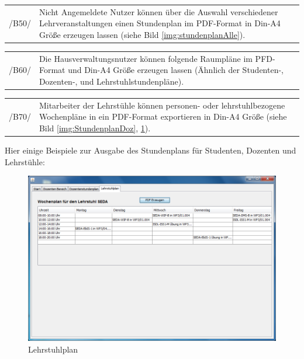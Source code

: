 \begin{tabular}{p{1.5cm}p{14.5cm}}
 /B50/	& Nicht Angemeldete Nutzer können über die Auswahl verschiedener Lehrveranstaltungen einen Stundenplan im PDF-Format in Din-A4 Größe erzeugen lassen (siehe Bild \ref{img:stundenplanAlle}). \\[0.25cm]	 
\end{tabular}

\begin{tabular}{p{1.5cm}p{14.5cm}}
 /B60/	& Die Hausverwaltungsnutzer können folgende Raumpläne im PFD-Format und Din-A4 Größe erzeugen lassen (Ähnlich der Studenten-, Dozenten-, und Lehrstuhlstundenpläne). \\[0.25cm]	 
\end{tabular}

\begin{tabular}{p{1.5cm}p{14.5cm}}
 /B70/	& Mitarbeiter der Lehrstühle können personen- oder lehrstuhlbezogene Wochenpläne in ein PDF-Format exportieren in Din-A4 Größe (siehe Bild \ref{img:StundenplanDoz}, \ref{img:LehrstuhlplanDoz}). \\[0.25cm]	 
\end{tabular}

Hier einige Beispiele zur Ausgabe des Stundenplans für Studenten, Dozenten und Lehrstühle:
\begin{figure}[H]
\begin{center}
\includegraphics[width=150mm]{images/section_7/DozentenLehrstuhlplan.PNG}
\caption{Lehrstuhlplan}
\label{img:LehrstuhlplanDoz}
\end{center}
\end{figure}

